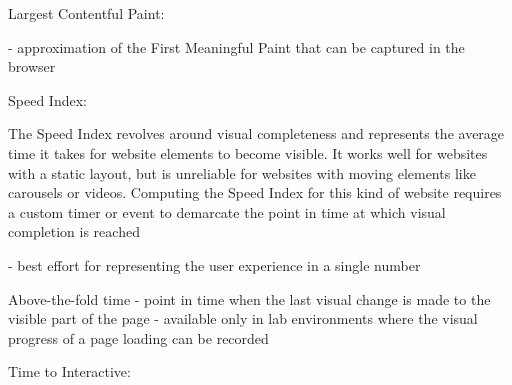 Largest Contentful Paint: %

- approximation of the First Meaningful Paint that can be captured in the browser




Speed Index: %

The Speed Index revolves around visual completeness and represents the average time it takes for website elements to become visible. It works well for websites with a static layout, but is unreliable for websites with moving elements like carousels or videos. Computing the Speed Index for this kind of website requires a custom timer or event to demarcate the point in time at which visual completion is reached

- best effort for representing the user experience in a single number



Above-the-fold time %
- point in time when the last visual change is made to the visible part of the page
- available only in lab environments where the visual progress of a page loading can be recorded





Time to Interactive: %












